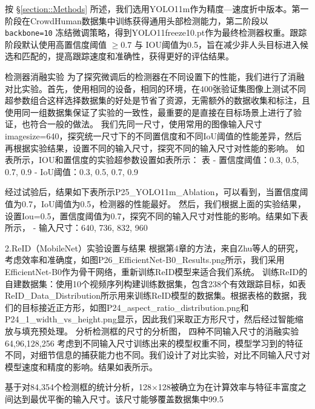 按 \S\ref{section::Methods} 所述，我们选用YOLO11m作为精度—速度折中版本。第一阶段在CrowdHuman数据集中训练获得通用头部检测能力，第二阶段以 \texttt{backbone=10} 冻结微调策略，得到YOLO11freeze10.pt作为最终检测器权重。跟踪阶段默认使用高置信度阈值 \(\geq 0.7\) 与 IOU阈值为0.5，旨在减少非人头目标进入候选和匹配的，提高跟踪速度和准确性，获得更好的评估结果。

检测器消融实验
为了探究微调后的检测器在不同设置下的性能，我们进行了消融对比实验。首先，使用相同的设备，相同的环境，在400张验证集图像上测试不同超参数组合这样选择数据集的好处是节省了资源，无需额外的数据收集和标注，且使用同一组数据集保证了实验的一致性，最重要的是直接在目标场景上进行了验证，也符合一般的做法。
我们先同一尺寸，使用常用的图像输入尺寸imagesize=640，探究统一尺寸下的不同置信度和不同IoU阈值的性能差异，然后再根据实验结果，设置不同的输入尺寸，探究不同的输入尺寸对性能的影响。
如表所示，IOU和置信度的实验超参数设置如表所示：
表
        - 置信度阈值：0.3, 0.5, 0.7, 0.9
        - IoU阈值：0.3, 0.5, 0.7, 0.9  

经过试验后，结果如下表所示P25_YOLO11m_Ablation，可以看到，当置信度阈值为0.7，IoU阈值为0.5，检测器的性能最好。
然后，我们根据上面的实验结果，设置Iou=0.5，置信度阈值为0.7，探究不同的输入尺寸对性能的影响。结果如下表所示，
- 输入尺寸：640, 736, 832, 960



2.ReID（MobileNet）实验设置与结果
根据第4章的方法，来自Zhu等人的研究\cite{218}，考虑效率和准确度，如图P26_EfficientNet-B0_Results.png所示，我们采用EfficientNet-B0作为骨干网络，重新训练ReID模型来适合我们系统。
训练ReID的自建数据集：使用10个视频序列构建训练数据集，包含238个有效跟踪目标，如表ReID_Data_Distribution所示用来训练ReID模型的数据集。根据表格的数据，我们的目标接近正方形，如图P24_aspect_ratio_distribution.png和P24_1_width_vs_height.png显示，因此我们采取正方形尺寸，然后经过智能缩放与填充预处理。
分析检测框的尺寸的分析图，
四种不同输入尺寸的消融实验 64,96,128,256
考虑到不同输入尺寸训练出来的模型权重不同，模型学习到的特征不同，对细节信息的捕获能力也不同。我们设计了对比实验，对比不同输入尺寸对模型速度和精度的影响。结果如表所示。


基于对84,354个检测框的统计分析，128×128被确立为在计算效率与特征丰富度之间达到最优平衡的输入尺寸。该尺寸能够覆盖数据集中99.5%


